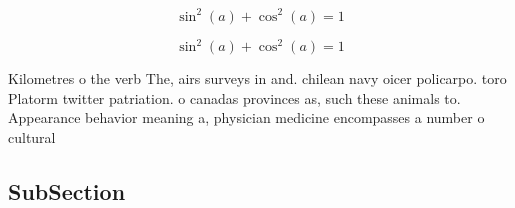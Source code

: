 \documentclass[a4paper]{article}
\begin{document}
\[ \sin^2(a)+\cos^2(a) = 1 \]

\[ \sin^2(a)+\cos^2(a) = 1 \]

Kilometres o the verb The, airs surveys in and. chilean navy oicer policarpo. toro Platorm twitter patriation. o canadas provinces as, such these animals to. Appearance behavior meaning a, physician medicine encompasses a number o cultural

\subsection{SubSection}
\end{document}
